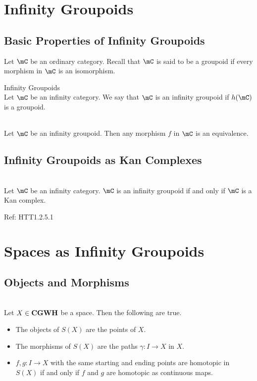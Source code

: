\documentclass[a4paper]{article}
\begin{document}
\pagebreak
\section{Infinity Groupoids}
\subsection{Basic Properties of Infinity Groupoids}
Let $\mC$ be an ordinary category. Recall that $\mC$ is said to be a groupoid if every morphism in $\mC$ is an isomorphism. 

\begin{defn}{Infinity Groupoids}{}\\ Let $\mC$ be an infinity category. We say that $\mC$ is an infinity groupoid if $h(\mC)$ is a groupoid. 
\end{defn}

\begin{lmm}{}{}\\ Let $\mC$ be an infinity groupoid. Then any morphism $f$ in $\mC$ is an equivalence. 
\end{lmm}

\subsection{Infinity Groupoids as Kan Complexes}
\begin{prp}{}{}\\ Let $\mC$ be an infinity category. $\mC$ is an infinity groupoid if and only if $\mC$ is a Kan complex. 
\end{prp}
Ref: HTT1.2.5.1


\pagebreak
\section{Spaces as Infinity Groupoids}
\subsection{Objects and Morphisms}
\begin{prp}{}{}\\ Let $X\in\bold{CGWH}$ be a space. Then the following are true. 
\begin{itemize}
\item The objects of $S(X)$ are the points of $X$. 
\item The morphisms of $S(X)$ are the paths $\gamma:I\to X$ in $X$. 
\item $f,g:I\to X$ with the same starting and ending points are homotopic in $S(X)$ if and only if $f$ and $g$ are homotopic as continuous maps. 
\end{itemize}
\end{prp}
\end{document}
